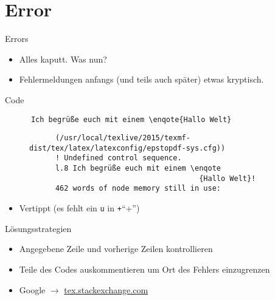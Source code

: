 \section{Error}
\begin{frame}[fragile]{Errors}
  \begin{itemize}
    \item Alles kaputt. Was nun?
    \item Fehlermeldungen anfangs (und teils auch später) etwas kryptisch.
  \end{itemize}
  \begin{block}{Code}
    \begin{verbatim}
      Ich begrüße euch mit einem \enqote{Hallo Welt}
    \end{verbatim}
  \end{block}
  \begin{figure}
    \centering
    \begin{verbatim}
      (/usr/local/texlive/2015/texmf-dist/tex/latex/latexconfig/epstopdf-sys.cfg))
      ! Undefined control sequence.
      l.8 Ich begrüße euch mit einem \enqote
                                       {Hallo Welt}!
      462 words of node memory still in use:
    \end{verbatim}
  \end{figure}
  \huge
  \begin{itemize}
    \item<2->[$\Rightarrow$] Vertippt (es fehlt ein \verb+u+ in \texttt+\enquote+)
  \end{itemize}
\end{frame}

\begin{frame}{Lösungsstrategien}
  \Large
  \begin{itemize}
    \item Angegebene Zeile und vorherige Zeilen kontrollieren
    \item Teile des Codes auskommentieren um Ort des Fehlers einzugrenzen
    \item Google $\rightarrow$ \href{http://tex.stackexchange.com}{tex.stackexchange.com}
  \end{itemize}
\end{frame}
